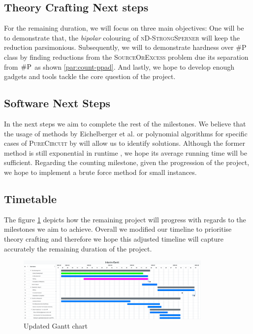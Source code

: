 \subsection{Theory Crafting Next steps}

For the remaining duration, we will focus on three main objectives:
One will be to demonstrate that, the \textit{bipolar} colouring
of \textsc{nD-StrongSperner} will keep the reduction parsimonious.
Subsequently, we will to demonstrate hardness over \textsc{\#P} class by finding
reductions from the \textsc{SourceOrExcess} problem due its separation from $\textsc{\#P}$ as shown \ref{par:count-ppad}.
And lastly, we hope to develop enough gadgets and tools tackle the core question of the project.


\subsection{Software Next Steps}

In the next steps we aim to complete the rest of the milestones. 
We believe that the usage of methods by Eichelberger et al. \cite{eichelberger_HazardDetectionCombinational_1965}
or polynomial algorithms for specific cases of \textsc{PureCircuit} by \cite{deligkas_PureCircuitTightInapproximability_2024}
will allow us to identify solutions.
Although the former method is still exponential in runtime \cite{eichelberger_HazardDetectionCombinational_1965,ikenmeyer_ComplexityHazardfreeCircuits_2019},
we hope its average running time will be sufficient.
Regarding the counting milestone, given the progression of the project, we hope to implement a brute force method
for small instances.

\subsection{Timetable}

The figure \ref{fig:gantt-new} depicts how the remaining project will progress with regards
to the milestones we aim to achieve. Overall we modified our timeline to prioritise
theory crafting and therefore we hope this adjusted timeline will capture accurately the remaining duration
of the project.

\begin{figure}[h!]
    \centering
    \includegraphics[width=0.85\textwidth]{assets/Interim Gantt 20250708.pdf}
    \caption{Updated Gantt chart}\label{fig:gantt-new}
\end{figure}

